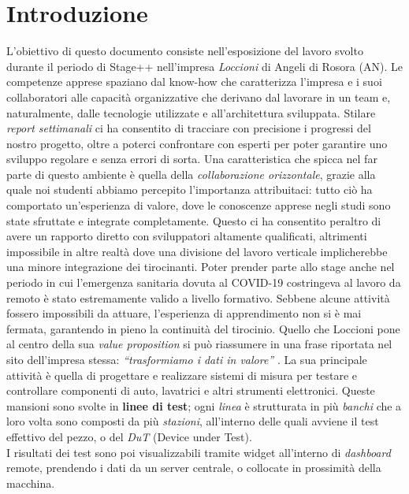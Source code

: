 \chapter{Introduzione}
\label{chap:intro}

L'obiettivo di questo documento consiste nell'esposizione del lavoro svolto durante il periodo di Stage++ nell'impresa \textit{Loccioni} di Angeli di Rosora (AN). Le competenze apprese spaziano dal know-how che caratterizza l'impresa e i suoi collaboratori alle capacità organizzative che derivano dal lavorare in un team e, naturalmente, dalle tecnologie utilizzate e all'architettura sviluppata.
Stilare \textit{report settimanali} ci ha consentito di tracciare con precisione i progressi del nostro progetto, oltre a poterci confrontare con esperti per poter garantire uno sviluppo regolare e senza errori di sorta.
Una caratteristica che spicca nel far parte di questo ambiente è quella della \textit{collaborazione orizzontale}, grazie alla quale noi studenti abbiamo percepito l'importanza attribuitaci: tutto ciò ha comportato un'esperienza di valore, dove le conoscenze apprese negli studi sono state sfruttate e integrate completamente.
Questo ci ha consentito peraltro di avere un rapporto diretto con sviluppatori altamente qualificati, altrimenti impossibile in altre realtà dove una divisione del lavoro verticale implicherebbe una minore integrazione dei tirocinanti.
Poter prender parte allo stage anche nel periodo in cui l'emergenza sanitaria dovuta al COVID-19 costringeva al lavoro da remoto è stato estremamente valido a livello formativo. Sebbene alcune attività fossero impossibili da attuare, l'esperienza di apprendimento non si è mai fermata, garantendo in pieno la continuità del tirocinio.
Quello che Loccioni pone al centro della sua \textit{value proposition} si può riassumere in una frase riportata nel sito dell'impresa stessa: \textit{``trasformiamo i dati in valore''} \cite{Loccioni}.
La sua principale attività è quella di progettare e realizzare sistemi di misura per 
testare e controllare componenti di auto, lavatrici e altri strumenti elettronici.
Queste mansioni sono svolte in \textbf{linee di test}; ogni \textit{linea} è strutturata in più \textit{banchi} che a loro volta sono composti da più \textit{stazioni}, all'interno delle quali avviene 
il test effettivo del pezzo, o del \textit{DuT} (Device under Test).\\
I risultati dei test sono poi visualizzabili tramite widget all'interno di \textit{dashboard} remote, prendendo i dati da un server centrale, 
o collocate in prossimità della macchina.
